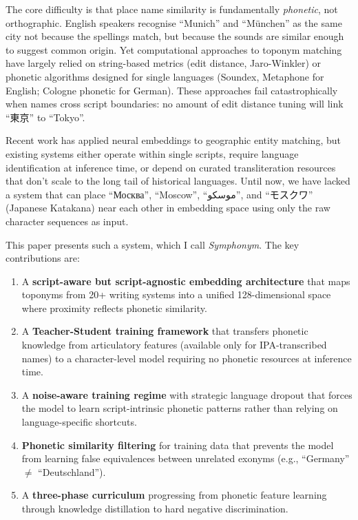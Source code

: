 \documentclass[11pt,a4paper]{article}
\newcommand{\textar}[1]{{\arabicfont #1}}
\newcommand{\textcn}[1]{{\chinesefont #1}}
\newcommand{\embdim}{128}
\begin{document}
The core difficulty is that place name similarity is fundamentally \emph{phonetic}, not orthographic. English speakers recognise ``Munich'' and ``München'' as the same city not because the spellings match, but because the sounds are similar enough to suggest common origin. Yet computational approaches to toponym matching have largely relied on string-based metrics (edit distance, Jaro-Winkler) or phonetic algorithms designed for single languages (Soundex, Metaphone for English; Cologne phonetic for German). These approaches fail catastrophically when names cross script boundaries: no amount of edit distance tuning will link ``\textcn{東京}'' to ``Tokyo''.

Recent work has applied neural embeddings to geographic entity matching, but existing systems either operate within single scripts, require language identification at inference time, or depend on curated transliteration resources that don't scale to the long tail of historical languages. Until now, we have lacked a system that can place ``Москва'', ``Moscow'', ``\textar{موسکو}'', and ``\textcn{モスクワ}'' (Japanese Katakana) near each other in embedding space using only the raw character sequences as input.

This paper presents such a system, which I call \emph{Symphonym}. The key contributions are:

\begin{enumerate}
    \item A \textbf{script-aware but script-agnostic embedding architecture} that maps toponyms from 20+ writing systems into a unified \embdim-dimensional space where proximity reflects phonetic similarity.

    \item A \textbf{Teacher-Student training framework} that transfers phonetic knowledge from articulatory features (available only for IPA-transcribed names) to a character-level model requiring no phonetic resources at inference time.

    \item A \textbf{noise-aware training regime} with strategic language dropout that forces the model to learn script-intrinsic phonetic patterns rather than relying on language-specific shortcuts.

    \item \textbf{Phonetic similarity filtering} for training data that prevents the model from learning false equivalences between unrelated exonyms (e.g., ``Germany'' $\neq$ ``Deutschland'').

    \item A \textbf{three-phase curriculum} progressing from phonetic feature learning through knowledge distillation to hard negative discrimination.
\end{enumerate}
\end{document}

